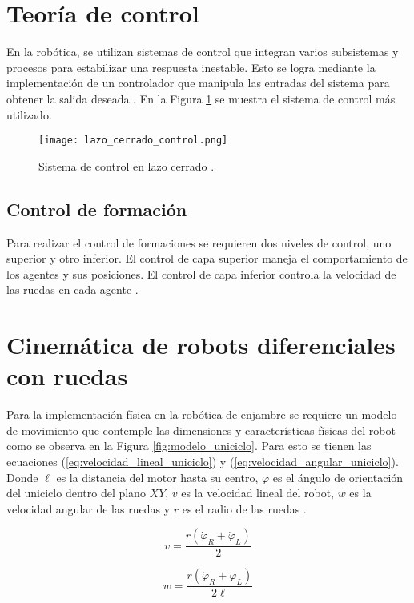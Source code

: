 \section{Teoría de control}
En la robótica, se utilizan sistemas de control que integran varios subsistemas y procesos para estabilizar una respuesta inestable. Esto se logra mediante la implementación de un controlador que manipula las entradas del sistema para obtener la salida deseada \cite{control_lazo_cerrado}. En la Figura \ref{fig:lazo_cerrado_control} se muestra el sistema de control más utilizado.

\begin{figure}[H]
	\centering
	\texttt{[image: lazo\_cerrado\_control.png]}
	\caption{Sistema de control en lazo cerrado \cite{control_lazo_cerrado}.}
	\label{fig:lazo_cerrado_control}
\end{figure}

\subsection{Control de formación}
Para realizar el control de formaciones se requieren dos niveles de control, uno superior y otro inferior. El control de capa superior maneja el comportamiento de los agentes y sus posiciones. El control de capa inferior controla la velocidad de las ruedas en cada agente \cite{PenaAM_2019_tesis}.

\section{Cinemática de robots diferenciales con ruedas}
Para la implementación física en la robótica de enjambre se requiere un modelo de movimiento que contemple las dimensiones y características físicas del robot como se observa en la Figura \ref{fig:modelo_uniciclo}. Para esto se tienen las ecuaciones (\ref{eq:velocidad_lineal_uniciclo}) y (\ref{eq:velocidad_angular_uniciclo}). Donde $\ell$ es la distancia del motor hasta su centro, $\varphi$ es el ángulo de orientación del uniciclo dentro del plano $XY$, $v$ es la velocidad lineal del robot, $w$ es la velocidad angular de las ruedas y $r$ es el radio de las ruedas \cite{ZeaM_modelo_uniciclo}.

\begin{equation}
	v = \frac{r(\dot{\varphi}_R + \dot{\varphi}_L)}{2}
	\label{eq:velocidad_lineal_uniciclo}
\end{equation}

\begin{equation}
	w = \frac{r(\dot{\varphi}_R + \dot{\varphi}_L)}{2\ell}
	\label{eq:velocidad_angular_uniciclo}
\end{equation}

